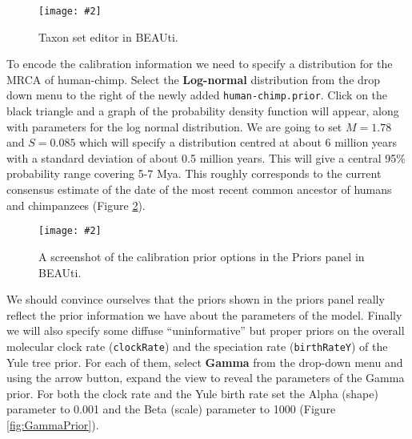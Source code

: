 \documentclass[12pt]{article}
\newcommand{\includeimage}[2][]{%
\texttt{[image: \#2]}
}
\begin{document}
\begin{figure}
\centering
\includeimage[width=9cm]{figures/BEAUti_TaxonSets}
\caption{Taxon set editor in BEAUti.}
\label{fig:BEAUti_TaxonSets}
\end{figure}

To encode the calibration information we need to specify a distribution for the MRCA of human-chimp.
Select the \textbf{Log-normal} distribution from the drop down menu to the right of the newly added \texttt{human-chimp.prior}. 
Click on the black triangle and a graph of the probability density function will appear, along with parameters for the log normal distribution.
We are going to set $M=1.78$ and $S=0.085$ which will specify a distribution centred at about 6 million
years with a standard deviation of about 0.5 million years. This will give
a central 95\% probability range covering 5-7 Mya. This roughly corresponds to the current consensus
estimate of the date of the most recent common ancestor of humans and chimpanzees (Figure \ref{fig:BEAUti_Prior2}).


\begin{figure}
\centering	
\includeimage[width=\textwidth]{figures/BEAUti_Prior2}
\caption{A screenshot of the calibration prior options in the Priors panel in BEAUti.}
\label{fig:BEAUti_Prior2}
\end{figure}

We should convince ourselves that the priors shown in the priors panel really reflect the prior information we have about the parameters of the model. Finally we will also specify some diffuse ``uninformative'' but proper priors on the overall molecular clock rate (\texttt{clockRate}) and the speciation rate (\texttt{birthRateY}) of the Yule tree prior. For each of them, select \textbf{Gamma} from the drop-down menu
and using the arrow button, expand the view to reveal the parameters of the
Gamma prior. For both the clock rate and the Yule birth rate set the Alpha
(shape) parameter to 0.001 and the Beta (scale) parameter to 1000 (Figure \ref{fig:GammaPrior}).
\end{document}
